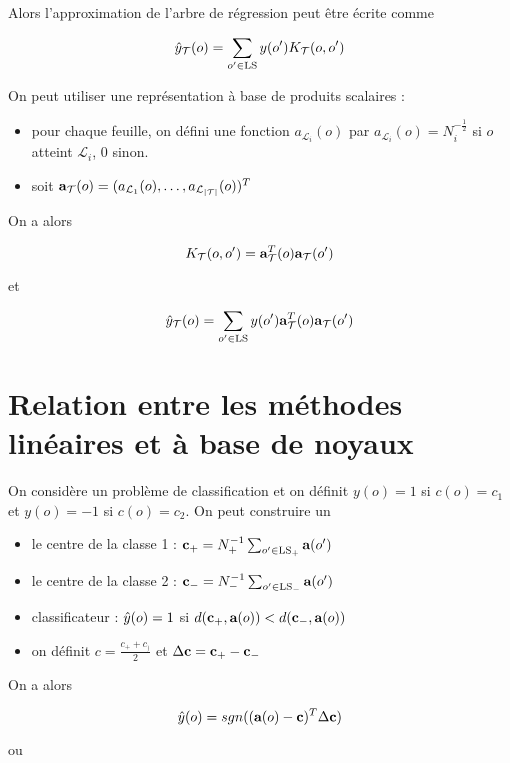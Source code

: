 	Alors l'approximation de l'arbre de régression peut être écrite comme
	
	$$\hat{y}_{\mathcal{T}}(o) = \sum_{o' \in \text{LS}}y(o') K_{\mathcal{T}}(o, o')$$
	
	
	On peut utiliser une représentation à base de produits scalaires :
	
	\begin{itemize}
		\item pour chaque feuille, on défini une fonction $a_{\mathcal{L}_i}(o)$ par $a_{\mathcal{L}_i}(o) = N_i^{- \frac{1}{2}}$ si $o$ atteint $\mathcal{L}_i$, 0 sinon.
		\item soit $\textbf{a}_{\mathcal{T}}(o) = (a_{\mathcal{L}_1}(o), \dots , a_{\mathcal{L}_{\vert \mathcal{T} \vert }}(o))^T$
	\end{itemize}
	
	On a alors
	
	$$K_{\mathcal{T}}(o, o') = \textbf{a}_{\mathcal{T}}^T(o) \textbf{a}_{\mathcal{T}}(o')$$
	
	et
	
	$$\hat{y}_{\mathcal{T}}(o) = \sum_{o' \in \text{LS}} y(o') \textbf{a}_{\mathcal{T}}^T(o) \textbf{a}_{\mathcal{T}}(o')$$
	
	\section{Relation entre les méthodes linéaires et à base de noyaux}
	
	On considère un problème de classification et on définit $y(o) = 1$ si $c(o) = c_1$ et $y(o) = -1$ si $c(o) = c_2$. On peut construire un
	
	\begin{itemize}
		\item le centre de la classe 1 : $\textbf{c}_+ = N_+^{-1} \sum_{o' \in \text{LS}_+} \textbf{a}(o')$
		\item le centre de la classe 2 : $\textbf{c}_- = N_-^{-1} \sum_{o' \in \text{LS}_-} \textbf{a}(o')$
		\item classificateur : $\hat{y}(o) = 1$ si $d(\textbf{c}_+, \textbf{a}(o)) < d(\textbf{c}_-, \textbf{a}(o))$
		\item on définit $c = \frac{c_+ + c_)}{2}$ et $\Delta \textbf{c} = \textbf{c}_+ - \textbf{c}_-$
	\end{itemize}
	
	On a alors
	
	$$\hat{y}(o) = sgn((\textbf{a}(o) - \textbf{c})^T \Delta \textbf{c})$$
	
	ou
	
	
